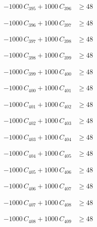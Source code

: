 \documentclass[a4paper,11pt]{article}
\begin{document}
\begin{align}
-1000\,C_{395} + 1000\,C_{396} &\geq 48 \nonumber
\end{align}

\begin{align}
-1000\,C_{396} + 1000\,C_{397} &\geq 48 \nonumber
\end{align}

\begin{align}
-1000\,C_{397} + 1000\,C_{398} &\geq 48 \nonumber
\end{align}

\begin{align}
-1000\,C_{398} + 1000\,C_{399} &\geq 48 \nonumber
\end{align}

\begin{align}
-1000\,C_{399} + 1000\,C_{400} &\geq 48 \nonumber
\end{align}

\begin{align}
-1000\,C_{400} + 1000\,C_{401} &\geq 48 \nonumber
\end{align}

\begin{align}
-1000\,C_{401} + 1000\,C_{402} &\geq 48 \nonumber
\end{align}

\begin{align}
-1000\,C_{402} + 1000\,C_{403} &\geq 48 \nonumber
\end{align}

\begin{align}
-1000\,C_{403} + 1000\,C_{404} &\geq 48 \nonumber
\end{align}

\begin{align}
-1000\,C_{404} + 1000\,C_{405} &\geq 48 \nonumber
\end{align}

\begin{align}
-1000\,C_{405} + 1000\,C_{406} &\geq 48 \nonumber
\end{align}

\begin{align}
-1000\,C_{406} + 1000\,C_{407} &\geq 48 \nonumber
\end{align}

\begin{align}
-1000\,C_{407} + 1000\,C_{408} &\geq 48 \nonumber
\end{align}

\begin{align}
-1000\,C_{408} + 1000\,C_{409} &\geq 48 \nonumber
\end{align}
\end{document}
